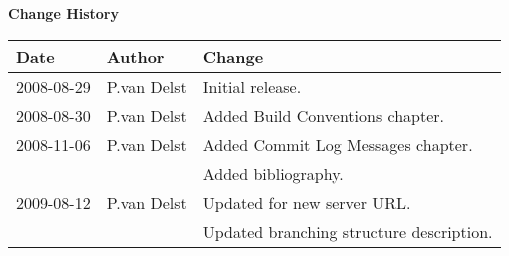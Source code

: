 \thispagestyle{empty}
\vspace*{10cm}
\begin{center}
  {\sffamily\Large\bfseries Change History}
  \begin{table}[htp]
    \centering
    \begin{tabular}{|p{2cm}|p{3cm}|p{8cm}|}
      \hline
      \sffamily\textbf{Date} & \sffamily\textbf{Author} & \sffamily\textbf{Change}\\
      \hline\hline
      2008-08-29 & P.van Delst & Initial release.\\
      \hline
      2008-08-30 & P.van Delst & Added Build Conventions chapter.\\
      \hline
      2008-11-06 & P.van Delst & Added Commit Log Messages chapter.\\
                 &             & Added bibliography.\\
      \hline
      2009-08-12 & P.van Delst & Updated for new server URL.\\
                 &             & Updated branching structure description. \\
      \hline
    \end{tabular}
  \end{table}
\end{center}
\clearpage
